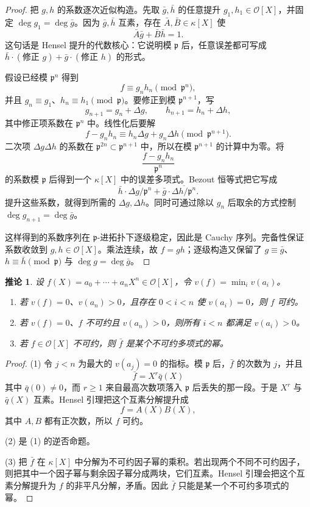 \documentclass[11pt,a4paper,openany]{ctexbook}
\numberwithin{equation}{chapter}
\theoremstyle{plain}
\newtheorem{corollary}[theorem]{推论}
\theoremstyle{definition}
\theoremstyle{remark}
\begin{document}
\begin{proof}
把 $g,h$ 的系数逐次近似构造。先取 $\bar g,\bar h$ 的任意提升
$g_1,h_1\in\mathcal O[X]$，并固定 $\deg g_1=\deg\bar g$。因为
\(\bar g,\bar h\) 互素，存在 $\bar A,\bar B\in\kappa[X]$ 使
\[
\bar A\bar g+\bar B\bar h=1.
\]
这句话是 Hensel 提升的代数核心：它说明模 $\mathfrak p$ 后，任意误差都可写成
\(\bar h\cdot(\text{修正 }g)+\bar g\cdot(\text{修正 }h)\) 的形式。

假设已经模 $\mathfrak p^n$ 得到
\[
f\equiv g_nh_n\pmod{\mathfrak p^n},
\]
并且 $g_n\equiv g_1$、$h_n\equiv h_1\pmod{\mathfrak p}$。要修正到模
$\mathfrak p^{n+1}$，写
\[
g_{n+1}=g_n+\Delta g,\qquad h_{n+1}=h_n+\Delta h,
\]
其中修正项系数在 $\mathfrak p^n$ 中。线性化后要解
\[
f-g_nh_n\equiv h_n\Delta g+g_n\Delta h\pmod{\mathfrak p^{n+1}}.
\]
二次项 $\Delta g\Delta h$ 的系数在 $\mathfrak p^{2n}\subset\mathfrak p^{n+1}$ 中，所以在模
$\mathfrak p^{n+1}$ 的计算中为零。将
\[
\frac{f-g_nh_n}{\mathfrak p^n}
\]
的系数模 $\mathfrak p$ 后得到一个 $\kappa[X]$ 中的误差多项式。Bezout 恒等式把它写成
\[
\bar h\cdot \overline{\Delta g/\mathfrak p^n}
+\bar g\cdot \overline{\Delta h/\mathfrak p^n}.
\]
提升这些系数，就得到所需的 $\Delta g,\Delta h$。同时可通过除以 $g_n$ 后取余的方式控制
\(\deg g_{n+1}=\deg\bar g\)。

这样得到的系数序列在 $\mathfrak p$-进拓扑下逐级稳定，因此是 Cauchy 序列。完备性保证系数收敛到 $g,h\in\mathcal O[X]$。乘法连续，故
$f=gh$；逐级构造又保留了
$g\equiv\bar g$、$h\equiv\bar h\pmod{\mathfrak p}$ 与 $\deg g=\deg\bar g$。
\end{proof}

\begin{corollary}
设 $f(X)=a_0+\cdots+a_nX^n\in\mathcal O[X]$，令 $v(f)=\min_i v(a_i)$。
\begin{enumerate}[label=(\arabic*)]
\item 若 $v(f)=0$、$v(a_n)>0$，且存在 $0<i<n$ 使 $v(a_i)=0$，则 $f$ 可约。
\item 若 $v(f)=0$、$f$ 不可约且 $v(a_n)>0$，则所有 $i<n$ 都满足 $v(a_i)>0$。
\item 若 $f\in\mathcal O[X]$ 不可约，则 $\bar f$ 是某个不可约多项式的幂。
\end{enumerate}
\end{corollary}

\begin{proof}
(1) 令 $j<n$ 为最大的 $v(a_j)=0$ 的指标。模 $\mathfrak p$ 后，$\bar f$ 的次数为 $j$，并且
\[
\bar f=X^r\bar q(X)
\]
其中 $\bar q(0)\ne0$，而 $r\ge1$ 来自最高次数项落入 $\mathfrak p$ 后丢失的那一段。于是
$X^r$ 与 $\bar q(X)$ 互素。Hensel 引理把这个互素分解提升成
\[
f=A(X)B(X),
\]
其中 $A,B$ 都有正次数，所以 $f$ 可约。

(2) 是 (1) 的逆否命题。

(3) 把 $\bar f$ 在 $\kappa[X]$ 中分解为不可约因子幂的乘积。若出现两个不同不可约因子，则把其中一个因子幂与剩余因子幂分成两块，它们互素。Hensel 引理会把这个互素分解提升为
$f$ 的非平凡分解，矛盾。因此 $\bar f$ 只能是某一个不可约多项式的幂。
\end{proof}
\end{document}
